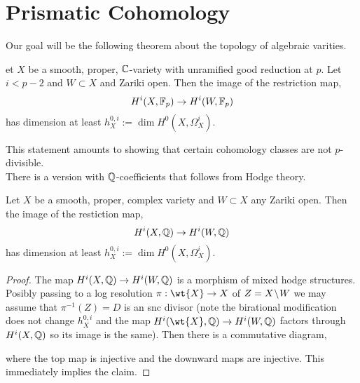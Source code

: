 \documentclass[12pt]{article}
\begin{document}
\section{Prismatic Cohomology}

\newcommand{\cO}{\mathcal{O}}
\newcommand{\LL}{\mathbb{L}}
\newcommand{\ad}{\mathrm{ad}}
\newcommand{\Spf}[1]{\mathrm{Spf}\left( #1 \right)}
\newcommand{\R}{\mathrm{R}}

Our goal will be the following theorem about the topology of algebraic varities. 

\begin{theorem}
et $X$ be a smooth, proper, $\mathbb{C}$-variety with unramified good reduction at $p$. Let $i < p - 2$ and $W \subset X$ and Zariki open. Then the image of the restriction map,
\[ H^i(X, \mathbb{F}_p) \to H^i(W, \mathbb{F}_p) \]
has dimension at least $h_X^{0,i} := \dim H^0(X, \Omega_X^i)$.
\end{theorem}

This statement amounts to showing that certain cohomology classes are not $p$-divisible.
\bigskip\\
There is a version with $\mathbb{Q}$-coefficients that follows from Hodge theory.

\begin{theorem}
Let $X$ be a smooth, proper, complex variety and $W \subset X$ any Zariki open. Then the image of the restiction map,
\[ H^i(X, \mathbb{Q}) \to H^i(W, \mathbb{Q}) \]
has dimension at least $h_X^{0,i} := \dim H^0(X, \Omega_X^i)$.
\end{theorem}

\begin{proof}
The map $H^i(X, \mathbb{Q}) \to H^i(W, \mathbb{Q})$ is a morphism of mixed hodge structures. Posibly passing to a log resolution $\pi : \wt{X} \to X$ of $Z = X \! \setminus \! W$ we may assume that $\pi^{-1}(Z) = D$ is an snc divisor (note the birational modification does not change $h^{0,i}_X$ and the map $H^i(\wt{X}, \QQ) \to H^i(W, \QQ)$ factors through $H^i(X, \mathbb{Q})$ so its image is the same). Then there is a commutative diagram,
\begin{center}
\end{center}
where the top map is injective and the downward maps are injective. This immediately implies the claim. 
\end{proof}
\end{document}
